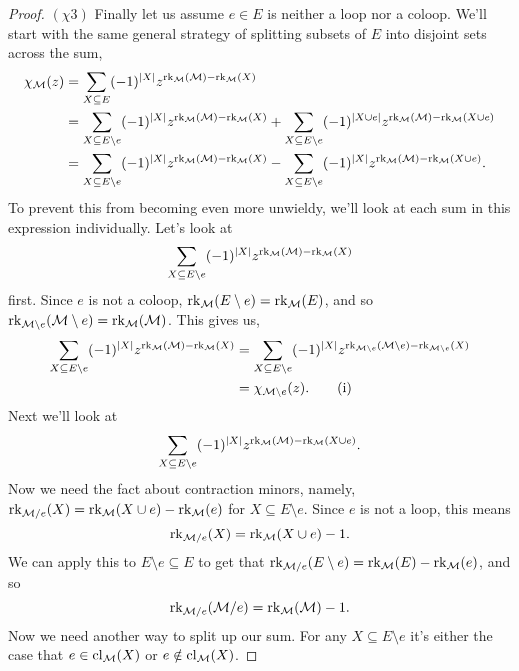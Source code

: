 \documentclass[12pt,oneside]{../../sfsuthesis}
\begin{document}
\begin{proof}
    \( (\chi 3 ) \) Finally let us assume \( e \in E \) is neither a loop nor a coloop.
    We'll start with the same general strategy of splitting subsets of \( E \) into disjoint sets across the sum,
    \begin{align*}
        \chi_{\mathcal{M}}(z) & = \sum_{X \subseteq E} (-1)^{|X|} z^{\operatorname{rk}_{\mathcal{M}}(\mathcal{M}) - \operatorname{rk}_{\mathcal{M}}(X)}                                                                                                        \\
                    & = \sum_{X \subseteq E \setminus e} (-1)^{|X|} z^{\operatorname{rk}_{\mathcal{M}}(\mathcal{M}) - \operatorname{rk}_{\mathcal{M}}(X)} +  \sum_{X \subseteq E \setminus e} (-1)^{|X \cup e|} z^{\operatorname{rk}_{\mathcal{M}}(\mathcal{M}) - \operatorname{rk}_{\mathcal{M}}(X \cup e)} \\
                    & = \sum_{X \subseteq E \setminus e} (-1)^{|X|} z^{\operatorname{rk}_{\mathcal{M}}(\mathcal{M}) - \operatorname{rk}_{\mathcal{M}}(X)} -  \sum_{X \subseteq E \setminus e} (-1)^{|X|} z^{\operatorname{rk}_{\mathcal{M}}(\mathcal{M}) - \operatorname{rk}_{\mathcal{M}}(X \cup e)}.
    \end{align*}
    To prevent this from becoming even more unwieldy, we'll look at each sum in this expression individually.
    Let's look at
    \[
        \sum_{X \subseteq E \setminus e} (-1)^{|X|} z^{\operatorname{rk}_{\mathcal{M}}(\mathcal{M}) - \operatorname{rk}_{\mathcal{M}}(X)}
    \]
    first.
    Since \( e \) is not a coloop, \( \operatorname{rk}_{\mathcal{M}} (E \setminus e) = \operatorname{rk}_{\mathcal{M}} (E) \), and so \( \operatorname{rk}_{\mathcal{M} \setminus e}(\mathcal{M} \setminus e) = \operatorname{rk}_{\mathcal{M}}(\mathcal{M}) \).
    This gives us,
    \begin{align*}
        \sum_{X \subseteq E \setminus e} (-1)^{|X|} z^{\operatorname{rk}_{\mathcal{M}}(\mathcal{M}) - \operatorname{rk}_{\mathcal{M}}(X)} & = \sum_{X \subseteq E \setminus e} (-1)^{|X|} z^{\operatorname{rk}_{\mathcal{M} \setminus e}(\mathcal{M} \setminus e) - \operatorname{rk}_{\mathcal{M} \setminus e}(X)} \\
                                                                                  & = \chi_{\mathcal{M} \setminus e}(z). \tag{i}\label{eq:deletion}
    \end{align*}
    Next we'll look at
    \[
        \sum_{X \subseteq E \setminus e} (-1)^{|X|} z^{\operatorname{rk}_{\mathcal{M}}(\mathcal{M}) - \operatorname{rk}_{\mathcal{M}}(X \cup e)}.
    \]
    Now we need the fact about contraction minors, namely, \( \operatorname{rk}_{\mathcal{M}/e}(X)  = \operatorname{rk}_{\mathcal{M}}(X \cup e) - \operatorname{rk}_{\mathcal{M}}(e) \) for \( X \subseteq E \setminus e \).
    Since \( e \) is not a loop, this means
    \[
        \operatorname{rk}_{\mathcal{M}/e}(X)  = \operatorname{rk}_{\mathcal{M}}(X \cup e) - 1.
    \]
    We can apply this to \( E \setminus e \subseteq E \) to get that \( \operatorname{rk}_{\mathcal{M}/e}(E \setminus e ) = \operatorname{rk}_{\mathcal{M}}(E) - \operatorname{rk}_{\mathcal{M}}(e) \), and so
    \[
        \operatorname{rk}_{\mathcal{M}/e}( \mathcal{M}/e ) = \operatorname{rk}_{\mathcal{M}}({\mathcal{M}}) - 1.
    \]
    Now we need another way to split up our sum.
    For any \( X \subseteq E \setminus e \) it's either the case that \( e \in \operatorname{cl}_{\mathcal{M}}(X) \) or \( e \notin \operatorname{cl}_{\mathcal{M}}(X) \).

\end{proof}
\end{document}

